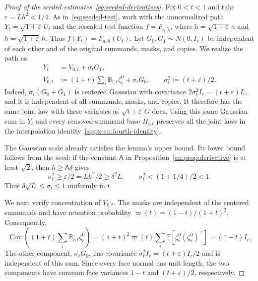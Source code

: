 \documentclass[11pt,letterpaper]{article}
\theoremstyle{remark}
\newcommand{\E}{\mathbb E}
\newcommand{\Cov}{\operatorname{Cov}}
\begin{document}
\begin{proof}[Proof of the seeded estimates~\eqref{eq:seeded-derivatives}]
Fix $0<t<1$ and take $\varepsilon=Lh^2<1/4$. As
in~\eqref{eq:seeded-test}, work with the unnormalized path
$Y_t=\sqrt{1+\varepsilon}\,U_t$ and the rescaled test function
$f=F_{\widetilde a,\widetilde h}$, where
$\widetilde a=\sqrt{1+\varepsilon}\,a$ and
$\widetilde h=\sqrt{1+\varepsilon}\,h$. Thus
$f(Y_t)=F_{a,h}(U_t)$.
Let $G_0,G_1\sim N(0,I_r)$ be independent of each other and of
the original summands, masks, and copies. We realize the path as
\begin{equation}
 \begin{aligned}
 Y_t&=V_{0,t}+\sigma_tG_1,\\
 V_{0,t}&\coloneqq(1+t)\sum_i\mathbb B_{i,t}\zeta_i^0
                      +\sigma_tG_0,\qquad
 \sigma_t^2\coloneqq(t+\varepsilon)/2.
 \end{aligned}
 \label{eq:seeded-gaussian-split}
\end{equation}
Indeed, $\sigma_t(G_0+G_1)$ is centered Gaussian with covariance
$2\sigma_t^2I_r=(t+\varepsilon)I_r$, and it is independent of
all summands, masks, and copies. It therefore has the same joint
law with these variables as $\sqrt{t+\varepsilon}\,G$ does.
Using this same Gaussian sum in $Y_t$ and every removed-summand
base $H_{i,t}$ preserves all the joint laws in the interpolation
identity~\eqref{appx-an:fourth-identity}.

The Gaussian scale already satisfies the lemma's upper bound.
Its lower bound follows from the seed: if the constant
$\mathsf A$ in Proposition~\ref{an:prop:derivative} is at least
$\sqrt2$, then $h\ge\mathsf A\delta$ gives
\[
 \sigma_t^2\ge\varepsilon/2=Lh^2/2\ge\delta^2L,
 \qquad
 \sigma_t^2<(1+1/4)/2<1.
\]
Thus $\delta\sqrt L\le\sigma_t\le1$ uniformly in $t$.

We next verify concentration of $V_{0,t}$. The masks are
independent of the centered summands and have retention
probability $\varpi(t)=(1-t)/(1+t)^2$. Consequently,
\[
 \Cov\left((1+t)\sum_i\mathbb B_{i,t}\zeta_i^0\right)
 =(1+t)^2\varpi(t)\sum_i\E[\zeta_i^0(\zeta_i^0)^\top]
 =(1-t)I_r.
\]
The other component, $\sigma_tG_0$, has covariance
$\sigma_t^2I_r=(t+\varepsilon)I_r/2$ and is independent of this
sum. Since every face normal has unit length, the two components
have common face variances $1-t$ and $(t+\varepsilon)/2$,
respectively.


\end{proof}
\end{document}
